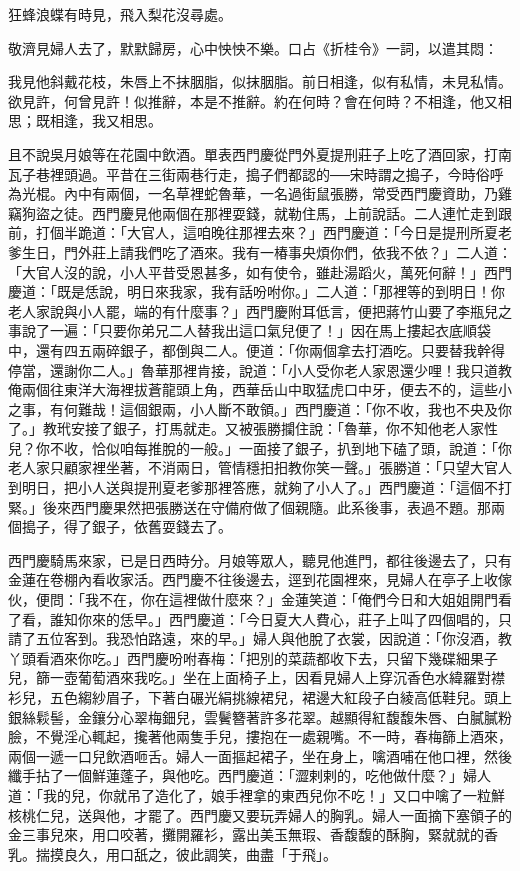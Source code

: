 狂蜂浪蝶有時見，飛入梨花沒尋處。

敬濟見婦人去了，默默歸房，心中怏怏不樂。口占《折桂令》一詞，以遣其悶：

我見他斜戴花枝，朱唇上不抹胭脂，似抹胭脂。前日相逢，似有私情，未見私情。欲見許，何曾見許！似推辭，本是不推辭。約在何時？會在何時？不相逢，他又相思；既相逢，我又相思。

且不說吳月娘等在花園中飲酒。單表西門慶從門外夏提刑莊子上吃了酒回家，打南瓦子巷裡頭過。平昔在三街兩巷行走，搗子們都認的──宋時謂之搗子，今時俗呼為光棍。內中有兩個，一名草裡蛇魯華，一名過街鼠張勝，常受西門慶資助，乃雞竊狗盜之徒。西門慶見他兩個在那裡耍錢，就勒住馬，上前說話。二人連忙走到跟前，打個半跪道：「大官人，這咱晚往那裡去來？」西門慶道：「今日是提刑所夏老爹生日，門外莊上請我們吃了酒來。我有一椿事央煩你們，依我不依？」二人道：「大官人沒的說，小人平昔受恩甚多，如有使令，雖赴湯蹈火，萬死何辭！」西門慶道：「既是恁說，明日來我家，我有話吩咐你。」二人道：「那裡等的到明日！你老人家說與小人罷，端的有什麼事？」西門慶附耳低言，便把蔣竹山要了李瓶兒之事說了一遍：「只要你弟兄二人替我出這口氣兒便了！」因在馬上摟起衣底順袋中，還有四五兩碎銀子，都倒與二人。便道：「你兩個拿去打酒吃。只要替我幹得停當，還謝你二人。」魯華那裡肯接，說道：「小人受你老人家恩還少哩！我只道教俺兩個往東洋大海裡拔蒼龍頭上角，西華岳山中取猛虎口中牙，便去不的，這些小之事，有何難哉！這個銀兩，小人斷不敢領。」西門慶道：「你不收，我也不央及你了。」教玳安接了銀子，打馬就走。又被張勝攔住說：「魯華，你不知他老人家性兒？你不收，恰似咱每推脫的一般。」一面接了銀子，扒到地下磕了頭，說道：「你老人家只顧家裡坐著，不消兩日，管情穩抇抇教你笑一聲。」張勝道：「只望大官人到明日，把小人送與提刑夏老爹那裡答應，就夠了小人了。」西門慶道：「這個不打緊。」後來西門慶果然把張勝送在守備府做了個親隨。此系後事，表過不題。那兩個搗子，得了銀子，依舊耍錢去了。

西門慶騎馬來家，已是日西時分。月娘等眾人，聽見他進門，都往後邊去了，只有金蓮在卷棚內看收家活。西門慶不往後邊去，逕到花園裡來，見婦人在亭子上收傢伙，便問：「我不在，你在這裡做什麼來？」金蓮笑道：「俺們今日和大姐姐開門看了看，誰知你來的恁早。」西門慶道：「今日夏大人費心，莊子上叫了四個唱的，只請了五位客到。我恐怕路遠，來的早。」婦人與他脫了衣裳，因說道：「你沒酒，教丫頭看酒來你吃。」西門慶吩咐春梅：「把別的菜蔬都收下去，只留下幾碟細果子兒，篩一壺葡萄酒來我吃。」坐在上面椅子上，因看見婦人上穿沉香色水緯羅對襟衫兒，五色縐紗眉子，下著白碾光絹挑線裙兒，裙邊大紅段子白綾高低鞋兒。頭上銀絲鬏髻，金鑲分心翠梅鈿兒，雲鬢簪著許多花翠。越顯得紅馥馥朱唇、白膩膩粉臉，不覺淫心輒起，攙著他兩隻手兒，摟抱在一處親嘴。不一時，春梅篩上酒來，兩個一遞一口兒飲酒咂舌。婦人一面摳起裙子，坐在身上，噙酒哺在他口裡，然後纖手拈了一個鮮蓮蓬子，與他吃。西門慶道：「澀剌剌的，吃他做什麼？」婦人道：「我的兒，你就吊了造化了，娘手裡拿的東西兒你不吃！」又口中噙了一粒鮮核桃仁兒，送與他，才罷了。西門慶又要玩弄婦人的胸乳。婦人一面摘下塞領子的金三事兒來，用口咬著，攤開羅衫，露出美玉無瑕、香馥馥的酥胸，緊就就的香乳。揣摸良久，用口舐之，彼此調笑，曲盡「于飛」。

